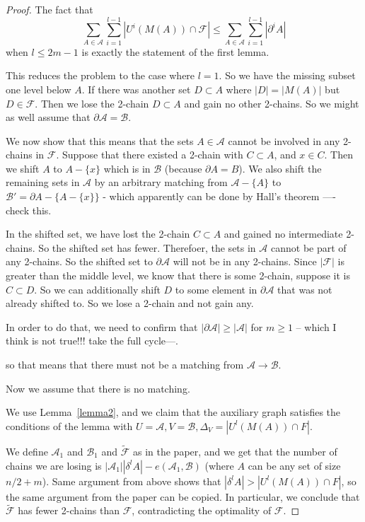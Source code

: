 \documentclass[12pt]{article}
\theoremstyle{plain}
\theoremstyle{definition}
\theoremstyle{remark}
\newcommand{\F}{\mathcal{F}}
\newcommand{\A}{\mathcal{A}}
\newcommand{\B}{\mathcal{B}}
\begin{document}
\begin{proof}
The fact that
\[ \sum_{A\in \A}\sum_{i = 1}^{l-1} |U^i(M(A)) \cap \F| \leq \sum_{A \in \A}\sum_{i = 1}^{l-1} |\partial^i A | \]
when $l \leq 2m-1$
is exactly the statement of the first lemma.


This reduces the problem to the case where $l=1$. So we have the missing subset one level below $A$. If there was another set $D \subset A$ where $|D| = |M(A)|$ but $D \in \F$. Then we lose the 2-chain $D \subset A$ and gain no other 2-chains. So we might as well assume that $\partial \A = \B$. 

We now show that this means that the sets $A \in \A$ cannot be involved in any 2-chains in $\F$. Suppose that there existed a 2-chain with $C \subset A$, and $x \in C$. Then we shift $A$ to $A - \{ x \}$ which is in $\B$ (because $\partial A = B$). We also shift the remaining sets in $\A$ by an arbitrary matching from $\A - \{ A \}$ to $\B' = \partial A - \{ A - \{x\} \}$ - which apparently can be done by Hall's theorem ---- check this. 

In the shifted set, we have lost the 2-chain $C \subset A$ and gained no intermediate 2-chains. So the shifted set has fewer. Therefoer, the sets in $\A$ cannot be part of any 2-chains. So the shifted set to $\partial \A$ will not be in any 2-chains. Since $|\F|$ is greater than the middle level, we know that there is some 2-chain, suppose it is $C \subset D$. So we can additionally shift $D$ to some element in $\partial \A$ that was not already shifted to. So we lose a 2-chain and not gain any. 

In order to do that, we need to confirm that $|\partial \A| \geq |\A|$ for $m\geq 1$ -- which I think is not true!!! take the full cycle---. 

so that means that there must not be a matching from $\A \rightarrow \B$. 


Now we assume that there is no matching.

We use Lemma~\ref{lemma2}, and we claim that the auxiliary graph satisfies the conditions of the lemma with $U = \A, V = \B, \Delta_V = |U^l(M(A)) \cap F|$.

We define $\A_1$ and $\B_1$ and $\tilde{\F}$ as in the paper, and we get that the number of chains we are losing is $|\A_1||\delta^l A| - e(\A_1,\B)$ (where $A$ can be any set of size $n/2 + m$). Same argument from above shows that $|\delta^l A| > |U^l(M(A)) \cap F|$, so the same argument from the paper can be copied. In particular, we conclude that $\tilde{\F}$ has fewer 2-chains than $\F$, contradicting the optimality of $\F$.




\end{proof}
\end{document}
